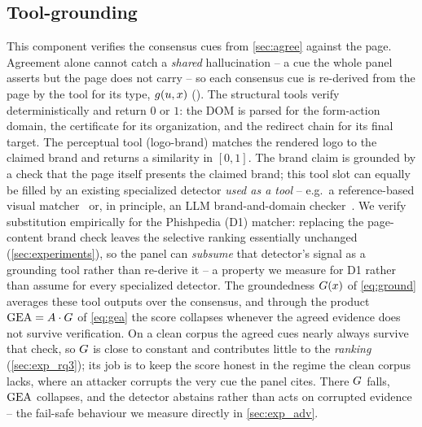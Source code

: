 \subsection{Tool-grounding}
\label{sec:ground}
This component verifies the consensus cues from \autoref{sec:agree} against the page.
Agreement alone cannot catch a \emph{shared} hallucination -- a cue the whole panel
asserts but the page does not carry -- so each consensus cue is re-derived from the
page by the tool for its type, $g(u,x)$ (). The structural tools verify
deterministically and return $0$ or $1$: the DOM is parsed for the form-action domain,
the certificate for its organization, and the redirect chain for its final target. The
perceptual tool (\textsf{logo-brand}) matches the rendered logo to the claimed brand
and returns a similarity in $[0,1]$. The brand claim is grounded by a check that the page
itself presents the claimed brand; this tool slot can equally be filled by an existing
specialized detector \emph{used as a tool} -- e.g.\ a reference-based visual
matcher~\cite{lin2021phishpedia} or, in principle, an LLM brand-and-domain
checker~\cite{tan2024phishllm}. We verify substitution empirically for the Phishpedia (D1)
matcher: replacing the page-content brand check leaves the selective ranking essentially
unchanged (\autoref{sec:experiments}), so the panel can \emph{subsume} that detector's
signal as a grounding tool rather than re-derive it -- a property we measure for D1 rather
than assume for every specialized detector. The groundedness $G(x)$ of
\eqref{eq:ground} averages these tool outputs over the consensus, and through the
product $\mathrm{GEA}=A\cdot G$ of \eqref{eq:gea} the score collapses whenever the
agreed evidence does not survive verification. On a clean corpus the agreed cues nearly
always survive that check, so $G$ is close to constant and contributes little to the
\emph{ranking} (\autoref{sec:exp_rq3}); its job is to keep the score honest in the
regime the clean corpus lacks, where an attacker corrupts the very cue the panel cites.
There $G$ falls, $\mathrm{GEA}$ collapses, and the detector abstains rather than acts on
corrupted evidence -- the fail-safe behaviour we measure directly in
\autoref{sec:exp_adv}.

